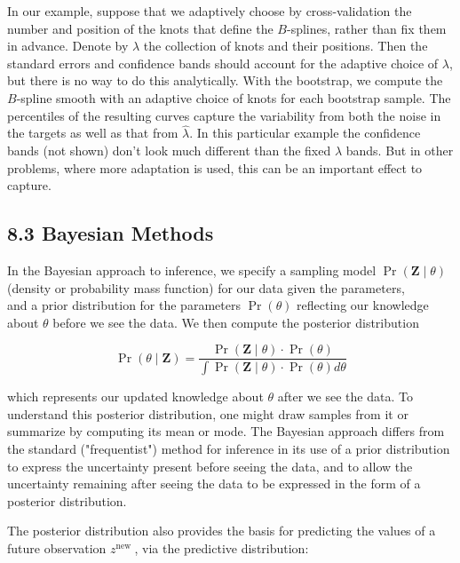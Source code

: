 \documentclass[10pt]{article}
\begin{document}
In our example, suppose that we adaptively choose by cross-validation the number and position of the knots that define the $B$-splines, rather than fix them in advance. Denote by $\lambda$ the collection of knots and their positions. Then the standard errors and confidence bands should account for the adaptive choice of $\lambda$, but there is no way to do this analytically. With the bootstrap, we compute the $B$-spline smooth with an adaptive choice of knots for each bootstrap sample. The percentiles of the resulting curves capture the variability from both the noise in the targets as well as that from $\hat{\lambda}$. In this particular example the confidence bands (not shown) don't look much different than the fixed $\lambda$ bands. But in other problems, where more adaptation is used, this can be an important effect to capture.

\subsection*{8.3 Bayesian Methods}
In the Bayesian approach to inference, we specify a sampling model $\operatorname{Pr}(\mathbf{Z} \mid \theta)$ (density or probability mass function) for our data given the parameters,\\
and a prior distribution for the parameters $\operatorname{Pr}(\theta)$ reflecting our knowledge about $\theta$ before we see the data. We then compute the posterior distribution


\begin{equation*}
\operatorname{Pr}(\theta \mid \mathbf{Z})=\frac{\operatorname{Pr}(\mathbf{Z} \mid \theta) \cdot \operatorname{Pr}(\theta)}{\int \operatorname{Pr}(\mathbf{Z} \mid \theta) \cdot \operatorname{Pr}(\theta) d \theta} \tag{8.23}
\end{equation*}


which represents our updated knowledge about $\theta$ after we see the data. To understand this posterior distribution, one might draw samples from it or summarize by computing its mean or mode. The Bayesian approach differs from the standard ("frequentist") method for inference in its use of a prior distribution to express the uncertainty present before seeing the data, and to allow the uncertainty remaining after seeing the data to be expressed in the form of a posterior distribution.

The posterior distribution also provides the basis for predicting the values of a future observation $z^{\text {new }}$, via the predictive distribution:
\end{document}
